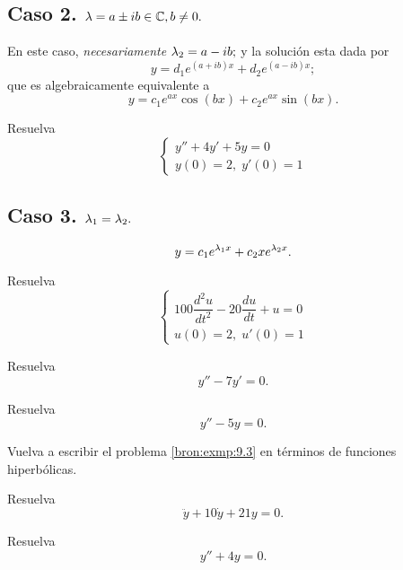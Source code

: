 \subsection{Caso 2. $\lambda =a\pm ib\in \mathbb{C}, b\neq 0.$}
En este caso,
\emph{necesariamente} $\lambda_{2}=a-ib;$ y
la soluci\'on esta dada por
\[
	\label{bron:9.5}
	y=d_{1}e^{\left( a+ib \right)x}
	+d_{2}e^{\left( a-ib \right)x};
\]
que es algebraicamente equivalente a
\[
	\label{bron:9.6}
	y=c_{1}e^{ax}\cos(bx)+c_{2}e^{ax}\sin(bx).
\]





\begin{resuelto}
	\label{bron:exmp:9.7}
	Resuelva
	$$\begin{cases}
		y''+4y'+5y=0 \\
		y(0)=2, \; y'(0)=1
	\end{cases}
	$$
\end{resuelto}




\subsection{Caso 3. $\lambda_{1}=\lambda_{2}.$}
\[
	\label{bron:9.7}
	y=c_{1}e^{\lambda_{1}x}+c_{2}xe^{\lambda_{2}x}.
\]





\begin{resuelto}
	\label{bron:exmp:9.15}
	Resuelva
	$$\begin{cases}
		100\dfrac{d^2{u}}{dt^{2}}
		-20\dfrac{du}{dt}+u=0\\
		u(0)=2, \; u'(0)=1
	\end{cases}
	$$
\end{resuelto}




\begin{resuelto}
	\label{bron:exmp:9.2}
	Resuelva $$y''-7y'=0.$$
\end{resuelto}





\begin{resuelto}
	\label{bron:exmp:9.3}
	Resuelva
	$$y''-5y=0.$$
\end{resuelto}




\begin{resuelto}
	\label{bron:exmp:9.4}
	Vuelva a escribir el problema \ref{bron:exmp:9.3} en t\'erminos de funciones hiperb\'olicas.
\end{resuelto}




\begin{resuelto}
	\label{bron:exmp:9.5}
	Resuelva
	$$
	\ddot{y}+10\dot{y}+21y=0.
	$$
\end{resuelto}




\begin{resuelto}
	\label{bron:exmp:9.8}
	Resuelva
	$$
	y''+4y=0.
	$$
\end{resuelto}


